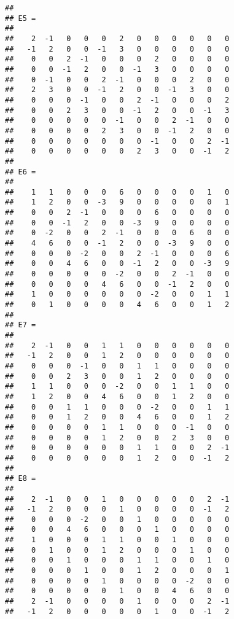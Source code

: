 \documentclass[a4paper]{article}
\begin{document}
\begin{verbatim}
## 
## E5 =
## 
##    2  -1   0   0   0   2   0   0   0   0   0   0
##   -1   2   0   0  -1   3   0   0   0   0   0   0
##    0   0   2  -1   0   0   0   2   0   0   0   0
##    0   0  -1   2   0   0  -1   3   0   0   0   0
##    0  -1   0   0   2  -1   0   0   0   2   0   0
##    2   3   0   0  -1   2   0   0  -1   3   0   0
##    0   0   0  -1   0   0   2  -1   0   0   0   2
##    0   0   2   3   0   0  -1   2   0   0  -1   3
##    0   0   0   0   0  -1   0   0   2  -1   0   0
##    0   0   0   0   2   3   0   0  -1   2   0   0
##    0   0   0   0   0   0   0  -1   0   0   2  -1
##    0   0   0   0   0   0   2   3   0   0  -1   2
## 
## E6 =
## 
##    1   1   0   0   0   6   0   0   0   0   1   0
##    1   2   0   0  -3   9   0   0   0   0   0   1
##    0   0   2  -1   0   0   0   6   0   0   0   0
##    0   0  -1   2   0   0  -3   9   0   0   0   0
##    0  -2   0   0   2  -1   0   0   0   6   0   0
##    4   6   0   0  -1   2   0   0  -3   9   0   0
##    0   0   0  -2   0   0   2  -1   0   0   0   6
##    0   0   4   6   0   0  -1   2   0   0  -3   9
##    0   0   0   0   0  -2   0   0   2  -1   0   0
##    0   0   0   0   4   6   0   0  -1   2   0   0
##    1   0   0   0   0   0   0  -2   0   0   1   1
##    0   1   0   0   0   0   4   6   0   0   1   2
## 
## E7 =
## 
##    2  -1   0   0   1   1   0   0   0   0   0   0
##   -1   2   0   0   1   2   0   0   0   0   0   0
##    0   0   0  -1   0   0   1   1   0   0   0   0
##    0   0   2   3   0   0   1   2   0   0   0   0
##    1   1   0   0   0  -2   0   0   1   1   0   0
##    1   2   0   0   4   6   0   0   1   2   0   0
##    0   0   1   1   0   0   0  -2   0   0   1   1
##    0   0   1   2   0   0   4   6   0   0   1   2
##    0   0   0   0   1   1   0   0   0  -1   0   0
##    0   0   0   0   1   2   0   0   2   3   0   0
##    0   0   0   0   0   0   1   1   0   0   2  -1
##    0   0   0   0   0   0   1   2   0   0  -1   2
## 
## E8 =
## 
##    2  -1   0   0   1   0   0   0   0   0   2  -1
##   -1   2   0   0   0   1   0   0   0   0  -1   2
##    0   0   0  -2   0   0   1   0   0   0   0   0
##    0   0   4   6   0   0   0   1   0   0   0   0
##    1   0   0   0   1   1   0   0   1   0   0   0
##    0   1   0   0   1   2   0   0   0   1   0   0
##    0   0   1   0   0   0   1   1   0   0   1   0
##    0   0   0   1   0   0   1   2   0   0   0   1
##    0   0   0   0   1   0   0   0   0  -2   0   0
##    0   0   0   0   0   1   0   0   4   6   0   0
##    2  -1   0   0   0   0   1   0   0   0   2  -1
##   -1   2   0   0   0   0   0   1   0   0  -1   2
\end{verbatim}
\end{document}
